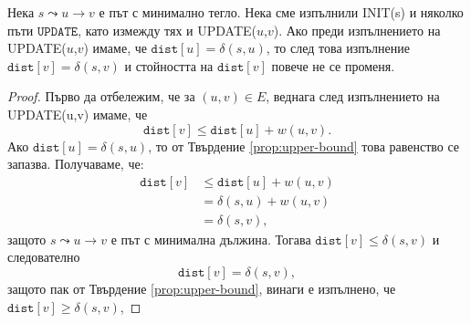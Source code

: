 \begin{prop}
  \label{prop:converge}
  Нека $s\leadsto u \to v$ е път с минимално тегло.
  Нека сме изпълнили INIT(s) и няколко пъти $\texttt{UPDATE}$, като измежду тях и UPDATE($u$,$v$).
  Ако преди изпълнението на UPDATE($u$,$v$) 
  имаме, че $\texttt{dist}[u] = \delta(s,u)$, то след това изпълнение
  $\texttt{dist}[v] = \delta(s,v)$ и стойността на $\texttt{dist}[v]$ повече не се променя.
\end{prop}
\begin{proof}
  Първо да отбележим, че за $(u,v) \in E$, веднага след изпълнението на UPDATE(u,v) имаме, че
  \[\texttt{dist}[v] \leq \texttt{dist}[u] + w(u,v).\]
  Ако $\texttt{dist}[u] = \delta(s,u)$, то от Твърдение \ref{prop:upper-bound} това равенство се запазва.
  Получаваме, че:
  \begin{align*}
    \texttt{dist}[v] & \leq \texttt{dist}[u] + w(u,v)\\
    & = \delta(s,u) + w(u,v)\\
    & = \delta(s,v),
  \end{align*}
  защото $s\leadsto u \to v$ е път с минимална дължина.
  Тогава $\texttt{dist}[v] \leq \delta(s,v)$ и следователно 
  \[\texttt{dist}[v] = \delta(s,v),\]
  защото пак от Твърдение \ref{prop:upper-bound}, винаги е изпълнено, че $\texttt{dist}[v] \geq \delta(s,v)$,
\end{proof}


